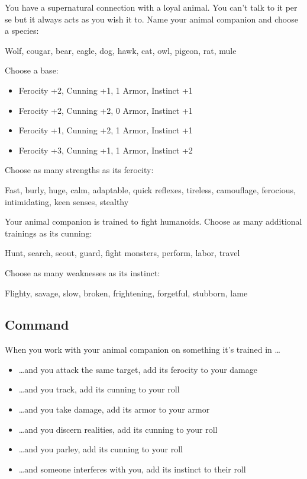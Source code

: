You have a supernatural connection with a loyal animal. You can't talk to it per se but it always acts as you wish it to. Name your animal companion and choose a species:

Wolf, cougar, bear, eagle, dog, hawk, cat, owl, pigeon, rat, mule

Choose a base:
\begin{itemize}
\item Ferocity +2, Cunning +1, 1 Armor, Instinct +1
\item Ferocity +2, Cunning +2, 0 Armor, Instinct +1
\item Ferocity +1, Cunning +2, 1 Armor, Instinct +1
\item Ferocity +3, Cunning +1, 1 Armor, Instinct +2

\end{itemize}

Choose as many strengths as its ferocity:

Fast, burly, huge, calm, adaptable, quick reflexes, tireless, camouflage, ferocious, intimidating, keen senses, stealthy

Your animal companion is trained to fight humanoids. Choose as many additional trainings as its cunning:

Hunt, search, scout, guard, fight monsters, perform, labor, travel

Choose as many weaknesses as its instinct:

Flighty, savage, slow, broken, frightening, forgetful, stubborn, lame
\subsection{Command}

When you work with your animal companion on something it's trained in \ldots 
\begin{itemize}
\item  \ldots and you attack the same target, add its ferocity to your damage
\item  \ldots and you track, add its cunning to your roll
\item  \ldots and you take damage, add its armor to your armor
\item  \ldots and you discern realities, add its cunning to your roll
\item  \ldots and you parley, add its cunning to your roll
\item  \ldots and someone interferes with you, add its instinct to their roll

\end{itemize}
